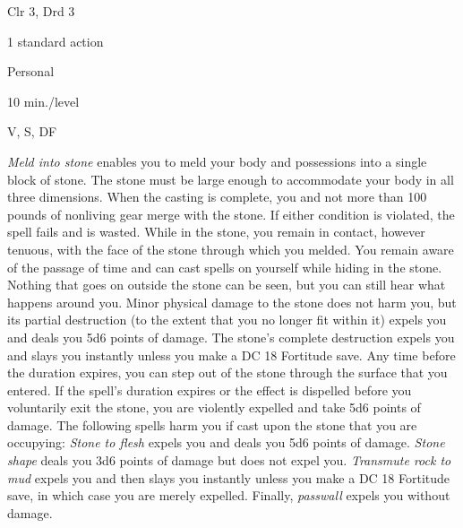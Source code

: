 
\begin{description*}
\item[Level:] Clr 3, Drd 3
\item[Casting Time:] 1 standard action
\item[Range:] Personal
\item[Duration:] 10 min./level
\item[Components:] V, S, DF
\end{description*}

\textit{Meld into stone} enables you to meld your body and possessions into a single
block of stone. The stone must be large enough to accommodate your body in all
three dimensions. When the casting is complete, you and not more than 100 pounds
of nonliving gear merge with the stone. If either condition is violated, the spell
fails and is wasted.
While in the stone, you remain in contact, however tenuous, with the face of the
stone through which you melded. You remain aware of the passage of time and can
cast spells on yourself while hiding in the stone. Nothing that goes on outside
the stone can be seen, but you can still hear what happens around you. Minor physical
damage to the stone does not harm you, but its partial destruction (to the extent
that you no longer fit within it) expels you and deals you 5d6 points of damage.
The stone's complete destruction expels you and slays you instantly unless you
make a DC 18 Fortitude save.
Any time before the duration expires, you can step out of the stone through the
surface that you entered. If the spell's duration expires or the effect is dispelled
before you voluntarily exit the stone, you are violently expelled and take 5d6
points of damage.
The following spells harm you if cast upon the stone that you are occupying: \textit{Stone
to flesh} expels you and deals you 5d6 points of damage. \textit{Stone shape} deals
you 3d6 points of damage but does not expel you. \textit{Transmute rock to mud
}expels you and then slays you instantly unless you make a DC 18 Fortitude save,
in which case you are merely expelled. Finally, \textit{passwall} expels you without
damage.